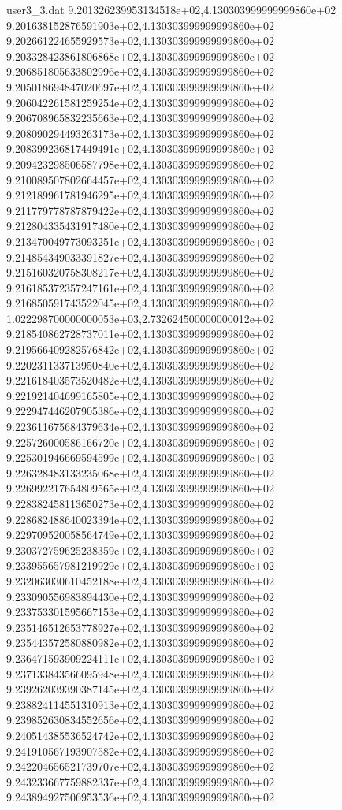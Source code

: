 \begin{filecontents}{user3_3.dat}
9.201326239953134518e+02,4.130303999999999860e+02
9.201638152876591903e+02,4.130303999999999860e+02
9.202661224655929573e+02,4.130303999999999860e+02
9.203328423861806868e+02,4.130303999999999860e+02
9.206851805633802996e+02,4.130303999999999860e+02
9.205018694847020697e+02,4.130303999999999860e+02
9.206042261581259254e+02,4.130303999999999860e+02
9.206708965832235663e+02,4.130303999999999860e+02
9.208090294493263173e+02,4.130303999999999860e+02
9.208399236817449491e+02,4.130303999999999860e+02
9.209423298506587798e+02,4.130303999999999860e+02
9.210089507802664457e+02,4.130303999999999860e+02
9.212189961781946295e+02,4.130303999999999860e+02
9.211779778787879422e+02,4.130303999999999860e+02
9.212804335431917480e+02,4.130303999999999860e+02
9.213470049773093251e+02,4.130303999999999860e+02
9.214854349033391827e+02,4.130303999999999860e+02
9.215160320758308217e+02,4.130303999999999860e+02
9.216185372357247161e+02,4.130303999999999860e+02
9.216850591743522045e+02,4.130303999999999860e+02
1.022298700000000053e+03,2.732624500000000012e+02
9.218540862728737011e+02,4.130303999999999860e+02
9.219566409282576842e+02,4.130303999999999860e+02
9.220231133713950840e+02,4.130303999999999860e+02
9.221618403573520482e+02,4.130303999999999860e+02
9.221921404699165805e+02,4.130303999999999860e+02
9.222947446207905386e+02,4.130303999999999860e+02
9.223611675684379634e+02,4.130303999999999860e+02
9.225726000586166720e+02,4.130303999999999860e+02
9.225301946669594599e+02,4.130303999999999860e+02
9.226328483133235068e+02,4.130303999999999860e+02
9.226992217654809565e+02,4.130303999999999860e+02
9.228382458113650273e+02,4.130303999999999860e+02
9.228682488640023394e+02,4.130303999999999860e+02
9.229709520058564749e+02,4.130303999999999860e+02
9.230372759625238359e+02,4.130303999999999860e+02
9.233955657981219929e+02,4.130303999999999860e+02
9.232063030610452188e+02,4.130303999999999860e+02
9.233090556983894430e+02,4.130303999999999860e+02
9.233753301595667153e+02,4.130303999999999860e+02
9.235146512653778927e+02,4.130303999999999860e+02
9.235443572580880982e+02,4.130303999999999860e+02
9.236471593909224111e+02,4.130303999999999860e+02
9.237133843566095948e+02,4.130303999999999860e+02
9.239262039390387145e+02,4.130303999999999860e+02
9.238824114551310913e+02,4.130303999999999860e+02
9.239852630834552656e+02,4.130303999999999860e+02
9.240514385536524742e+02,4.130303999999999860e+02
9.241910567193907582e+02,4.130303999999999860e+02
9.242204656521739707e+02,4.130303999999999860e+02
9.243233667759882337e+02,4.130303999999999860e+02
9.243894927506953536e+02,4.130303999999999860e+02

\end{filecontents}
